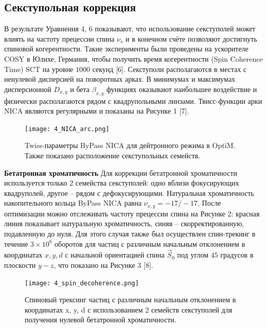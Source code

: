 \subsection{Секступольная коррекция}\label{sec:EDM/Wien_filter_tracking/sextupole_correction}

\par В результате Уравнения 4, 6 показывают, что использование секступолей может влиять на частоту прецессии спина $\nu_s$ и в конечном счёте позволяют достигнуть спиновой когерентности. Такие эксперименты были проведены на ускорителе COSY в Юлихе, Германия, чтобы получить время когерентности (Spin Coherence Time) SCT на уровне $1000$ секунд [6]. Секступоли располагаются в местах с ненулевой дисперсией на поворотных арках. В минимумах и максимумах дисперсионной $D_{x,y}$ и бета $\beta_{x,y}$ функциях оказывают наибольшее воздействие и физически располагаются рядом с квадрупольными линзами. Твисс-функции арки NICA являются регулярными и показаны на Рисунке 1 [7].

\begin{figure}[!h]
  \centering
   \texttt{[image: 4\_NICA\_arc.png]}
   \caption{Twiss-параметры ByPass NICA для дейтронного режима в OptiM. Также показано расположение секступольных семейств.}
   \label{fig:4_NICA_arc}
\end{figure}

\textbf{Бетатронная хроматичность}
Для коррекции бетатронной хроматичности используется только 2 семейства секступолей: одно вблизи фокусирующих квадруполей, другое – рядом с дефокусирующими. Натуральная хроматичность накопительного кольца ByPass NICA равна $\nu_{x,y}=-17/-17$. После оптимизации можно отслеживать частоту прецессии спина на Рисунке 2: красная линия показывает натуральную хроматичность, синяя – скорректированную, подавленную до нуля. Для этого случая также был осуществлен спин-трекинг в течение $3\times{10}^6$ оборотов для частиц с различным начальным отклонением в координатах $x, y, d$ с начальной ориентацией спина ${\vec{S}}_0$ под углом $45$ градусов в плоскости $y-z$, что показано на Рисунке 3 [8].

\begin{figure}[!h]
  \centering
   \texttt{[image: 4\_spin\_decoherence.png]}
   \caption{Спиновый трексинг частиц с различным начальным отклонением в координатах x, y, d с использованием 2 семейств секступолей для получения нулевой бетатронной хроматичности.}
   \label{fig:4_spin_decoherence}
\end{figure}

